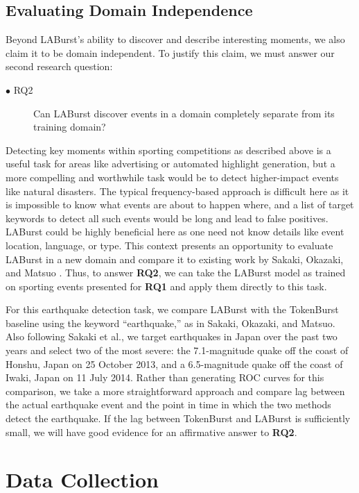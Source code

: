 \documentclass[letterpaper]{article}
\begin{document}
\subsection{Evaluating Domain Independence}

Beyond LABurst's ability to discover and describe interesting moments, we also claim it to be domain independent.
To justify this claim, we must answer our second research question:
\begin{description}
\item[$\bullet$ RQ2] Can LABurst discover events in a domain completely separate from its training domain?
\end{description}

Detecting key moments within sporting competitions as described above is a useful task for areas like advertising or automated highlight generation, but a more compelling and worthwhile task would be to detect higher-impact events like natural disasters.
The typical frequency-based approach is difficult here as it is impossible to know what events are about to happen where, and a list of target keywords to detect all such events would be long and lead to false positives.
LABurst could be highly beneficial here as one need not know details like event location, language, or type.
This context presents an opportunity to evaluate LABurst in a new domain and compare it to existing work by Sakaki, Okazaki, and Matsuo \cite{Sakaki:2010:EST:1772690.1772777}.
Thus, to answer \textbf{RQ2}, we can take the LABurst model as trained on sporting events presented for \textbf{RQ1} and apply them directly to this task.

For this earthquake detection task, we compare LABurst with the TokenBurst baseline using the keyword ``earthquake,'' as in Sakaki, Okazaki, and Matsuo.
Also following Sakaki et al., we target earthquakes in Japan over the past two years and select two of the most severe: the 7.1-magnitude quake off the coast of Honshu, Japan on 25 October 2013, and a 6.5-magnitude quake off the coast of Iwaki, Japan on 11 July 2014.
Rather than generating ROC curves for this comparison, we take a more straightforward approach and compare lag between the actual earthquake event and the point in time in which the two methods detect the earthquake.
If the lag between TokenBurst and LABurst is sufficiently small, we will have good evidence for an affirmative answer to \textbf{RQ2}.

\section{Data Collection}
\end{document}
